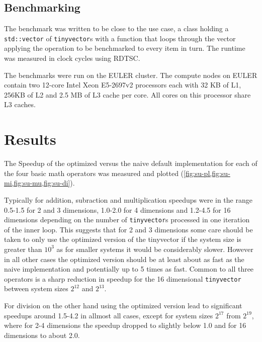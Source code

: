\documentclass[a4paper]{scrartcl}
\begin{document}
\subsection*{Benchmarking}
The benchmark was written to be close to the use case, a class holding a \texttt{std::vector} of \texttt{tinyvector}s 
with a function that loops through the vector applying the operation to be benchmarked to every item in turn.
The runtime was measured in clock cycles using RDTSC.

The benchmarks were run on the EULER cluster. The compute nodes on EULER contain two 12-core Intel Xeon E5-2697v2 processors each with 32 KB of L1, 256KB of L2 and 2.5 MB of L3 cache per core.
All cores on this processor share L3 caches.

\section*{Results}
The Speedup of the optimized versus the naive default implementation for each of the four basic math operators was measured and plotted (\cref{fig:su-pl,fig:su-mi,fig:su-mu,fig:su-di}).

Typically for addition, subraction and multiplication speedups were in the range 0.5-1.5 for 2 and 3 dimensions, 1.0-2.0 for 4 dimensions and 1.2-4.5 for 16 dimensions depending on the number of \texttt{tinyvector}s processed in one iteration of the inner loop.
This suggests that for 2 and 3 dimensions some care should be taken to only use the optimized version of the tinyvector if the system size is greater than $10^3$ as for smaller systems it would be considerably slower. However in all other cases the optimized version should be at least about as fast as the naive implementation and potentially up to 5 times as fast.
Common to all three operators is a sharp reduction in speedup for the 16 dimensional \texttt{tinyvector} between system sizes $2^12$ and $2^13$.

For division on the other hand using the optimized version lead to significant speedups around 1.5-4.2 in allmost all cases, except for system sizes $2^17$ from $2^19$, where for 2-4 dimensions the speedup dropped to slightly below 1.0 and for 16 dimensions to about 2.0.
\end{document}
